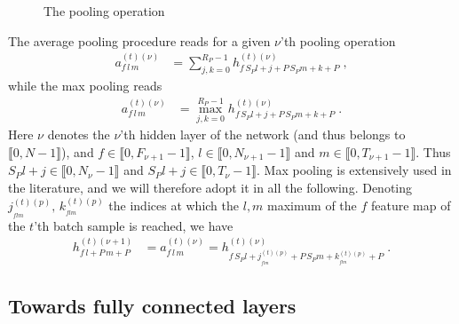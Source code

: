 \begin{figure}[H]
\begin{center}
\caption{The pooling operation}
\end{center}
\end{figure}

The average pooling procedure reads for a given $\nu$'th pooling operation
\begin{align}
a_{f\,l\,m}^{(t)(\nu)}&=\sum^{R_P-1}_{j,k=0} h_{f\,S_P l+j+P\,S_Pm+k+P}^{(t)(\nu)}\;,
\end{align}
while the max pooling reads
\begin{align}
a_{f\,l\,m}^{(t)(\nu)}&=\max^{R_P-1}_{j,k=0} h_{f\,S_P l+j+P\,S_Pm+k+P}^{(t)(\nu)}\;.
\end{align}
Here $\nu$ denotes the $\nu$'th hidden layer of the network (and thus belongs to $\llbracket0,N-1 \rrbracket$), and $f\in\llbracket0,F_{\nu+1}-1\rrbracket$, $l\in\llbracket0,N_{\nu+1}-1 \rrbracket$ and $m\in\llbracket0,T_{\nu+1}-1 \rrbracket$. Thus $S_Pl+j\in\llbracket0,N_\nu-1 \rrbracket$ and $S_Pl+j\in\llbracket0,T_\nu-1 \rrbracket$. Max pooling is extensively used in the literature, and we will therefore adopt it in all the following. Denoting $j^{(t)(p)}_{_{flm}},\,k^{(t)(p)}_{_{flm}}$ the indices at which the $l,m$ maximum of the $f$ feature map of the $t$'th batch sample is reached, we have
\begin{align}
h_{f\,l+P\,m+P}^{(t)(\nu+1)}&=a_{f\,l\,m}^{(t)(\nu)}=
%
h^{(t)(\nu)}_{f\,S_P l+j^{(t)(p)}_{_{flm}}+P\,S_Pm+k^{(t)(p)}_{_{flm}}+P}\;.
\end{align}

\subsection{Towards fully connected layers}


